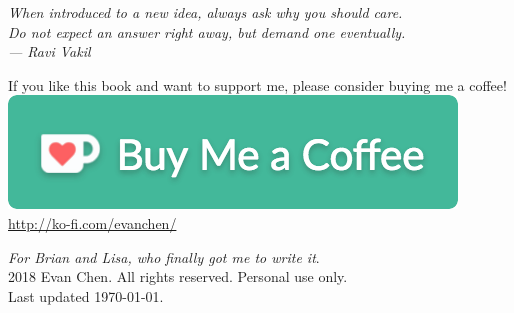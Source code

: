 \begin{titlepage}
	\vspace*{3cm}
	\begin{flushright}
		\large\itshape
		When introduced to a new idea, always ask why you should care. \\[0.2cm]
		Do not expect an answer right away, but demand one eventually. \\[0.8cm]
		--- Ravi Vakil \cite{ref:vakil}
	\end{flushright}

	\vspace*{8em}
	\hrulebar

	\begin{center}
	\begin{minipage}{50ex}
		\centering
		If you like this book and want to support me,
		please consider buying me a coffee! \\[2ex]
		\href{http://ko-fi.com/evanchen}{\includegraphics[width=32ex]{media/kofi4.png}} \\
		\url{http://ko-fi.com/evanchen/}
	\end{minipage}
	\end{center}
	
	\vfill
	{
	\small
	\noindent \emph{For Brian and Lisa, who finally got me to write it}. \\[0.4cm]
	\noindent {\copyright} 2018 Evan Chen.
	All rights reserved. Personal use only. \\[0.4cm]
	\noindent Last updated \today.
	\vspace*{1cm}
	}
\end{titlepage}
